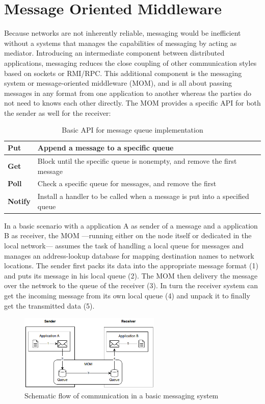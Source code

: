 \newpage
\section{Message Oriented Middleware}
\label{intro-messaging-mom}
Because networks are not inherently reliable, messaging would be inefficient
without a systems that manages the capabilities of messaging by acting as
mediator. Introducing an intermediate component between distributed
applications, messaging reduces the close coupling of other communication styles
based on sockets or RMI/RPC. This additional component is the messaging
system or message-oriented middleware (MOM), and is all about passing messages
in any format from one application to another whereas the parties do not need to
knows each other directly. \cite{TAN06} The MOM provides a specific API for both
the sender as well for the receiver:
\begin{table}[H]
\centering
\begin{tabular}{|l|l|}
\hline
\textbf{Put}    & Append a message to a specific queue                                        \\ \hline
\textbf{Get}    & Block until the specific queue is nonempty, and remove the first message    \\ \hline
\textbf{Poll}   & Check a specific queue for messages, and remove the first                   \\ \hline
\textbf{Notify} & Install a handler to be called when a message is put into a specified queue \\ \hline
\end{tabular}
\caption{Basic API for message queue implementation \cite{TAN06}}
\end{table}

In a basic scenario with a application A as sender of a message and a
application B as receiver, the MOM ---running either on the node itself or
dedicated in the local network--- assumes the task of handling a local queue for
messages and manages an address-lookup database for mapping destination names to
network locations. The sender first packs its data into the appropriate
message format (1) and puts its message in his local queue (2). The MOM then
delivery the message over the network to the queue of the receiver (3). In turn the
receiver system can get the incoming message from its own local queue (4) and
unpack it to finally get the transmitted data (5). 
\begin{figure}[H]
    \centering
    \includegraphics[width=0.6\textwidth]{images/mom-schema.png}
    \caption{Schematic flow of communication in a basic messaging system }
    \label{fig:message-oriented-middleware}
\end{figure}

